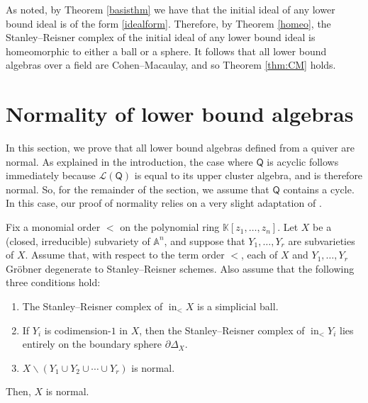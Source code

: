 \documentclass[ALCO,published]{cedram}
\numberwithin{equation}{section}
\DeclareMathOperator{\In}{\mathrm{in}}
\newcommand{\1}{^{-1}}
\def\Q{\mathsf{Q}}
\begin{document}
As noted, by Theorem \ref{basisthm} we have that the initial ideal of
any lower bound ideal is of the form \eqref{idealform}. Therefore, by
Theorem \ref{homeo}, the Stanley--Reisner complex of the initial ideal
of any lower bound ideal is homeomorphic to either a ball or a sphere.
It follows that all lower bound algebras over a field are
Cohen--Macaulay, and so Theorem \ref{thm:CM}
holds. 

\section{Normality of lower bound algebras}\label{sect:normality}

In this section, we prove that all lower bound algebras defined from a quiver are normal. As explained in the introduction, the case where $\Q$ is acyclic follows immediately because $\mathcal{L}(\Q)$ is equal to its upper cluster algebra, and is therefore normal. So, for the remainder of the section, we assume that $\Q$ contains a cycle.
In this case, our proof of normality relies on a very slight adaptation of \cite[Proposition 8.1]{KLS-Richardson}. 



\begin{prop}\label{prop:normalityInGeneral}
Fix a monomial order $<$ on the polynomial ring $\mathbb{K}[z_1,\dots,z_n]$. 
Let $X$ be a \upn(closed, irreducible\upn) subvariety of $\mathbb{A}^n$, and suppose that $Y_1,\dots, Y_r$ are subvarieties of $X$. %
Assume that, with respect to the term order $<$, each of $X$ and $Y_1,\dots, Y_r$ Gr\"obner degenerate to Stanley--Reisner schemes. Also assume that the following three conditions hold:
\begin{enumerate}
\item The Stanley--Reisner complex of $\In_<X$ is a simplicial ball.
\item If $Y_i$ is codimension-$1$ in $X$, then the Stanley--Reisner complex of $\In_<Y_i$ lies entirely on the boundary sphere $\partial \Delta_X$.
\item $X\smallsetminus (Y_1\cup Y_2\cup \cdots \cup Y_r)$ is normal.
\end{enumerate}
Then, $X$ is normal.
\end{prop}
\end{document}
